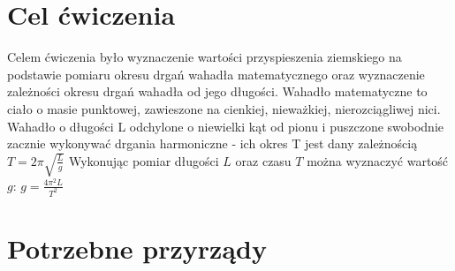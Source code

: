 \documentclass[a4paper,11pt]{article}
\begin{document}



\section{Cel ćwiczenia}
Celem ćwiczenia było wyznaczenie wartości przyspieszenia ziemskiego na podstawie pomiaru okresu drgań wahadła matematycznego oraz wyznaczenie zależności okresu drgań wahadła od jego długości. 
Wahadło matematyczne to ciało o masie punktowej, zawieszone na cienkiej, nieważkiej, nierozciągliwej nici. Wahadło o długości L odchylone o niewielki kąt od pionu i puszczone swobodnie zacznie wykonywać drgania harmoniczne - ich okres T jest dany zależnością $T = 2\pi\sqrt{\frac{L}{g}} $
Wykonując pomiar długości $L$ oraz czasu $T$ można wyznaczyć wartość $g$: $g = \frac{4\pi^2 L}{T^2}$
\section{Potrzebne przyrządy}
\end{document}
